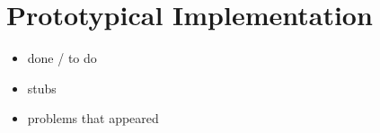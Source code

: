 \section{Prototypical Implementation}

\begin{itemize}
\item done / to do
\item stubs
\item problems that appeared
\end{itemize}

